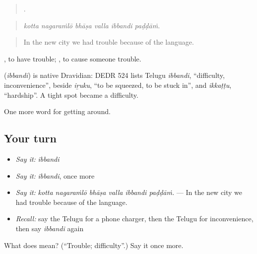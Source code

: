 \begin{quote}
     .
\end{quote}

\begin{quote}
\emph{kotta nagaraṁlō bhāṣa valla ibbandi paḍḍāṁ.}
\end{quote}

\begin{quote}
In the new city we had trouble because of the language.
\end{quote}

 , to have trouble;  , to cause someone trouble.

\begin{cousinweb}
\textbf{} (\emph{ibbandi}) is native Dravidian: DEDR 524 lists Telugu \emph{ibbandi}, \textquotedblleft{}difficulty, inconvenience\textquotedblright{}, beside \emph{iṟuku}, \textquotedblleft{}to be squeezed, to be stuck in\textquotedblright{}, and \emph{ikkaṭṭu}, \textquotedblleft{}hardship\textquotedblright{}. A tight spot became a difficulty.
\end{cousinweb}

\begin{grammarlens}[title={What you've built}]
One more word for getting around.
\end{grammarlens}

\subsection*{Your turn}
\begin{itemize}
\raggedright
  \item \emph{Say it:} \emph{ibbandi}
  \item \emph{Say it:} \emph{ibbandi}, once more
  \item \emph{Say it:} \emph{kotta nagaraṁlō bhāṣa valla ibbandi paḍḍāṁ.} — In the new city we had trouble because of the language.
  \item \emph{Recall:} say the Telugu for a phone charger, then the Telugu for inconvenience, then say \emph{ibbandi} again
\end{itemize}

\begin{tcolorbox}[breakable,colback=teal!4,colframe=teal!35!black,title={Before you move on}]
What does  mean? (\textquotedblleft{}Trouble; difficulty\textquotedblright{}.) Say it once more.
\end{tcolorbox}
